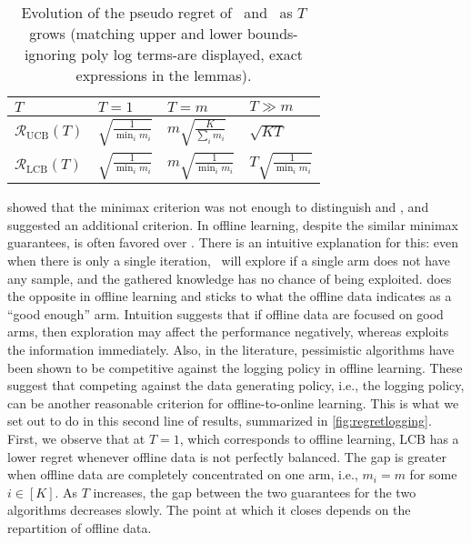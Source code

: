 \begin{table}[bth] 
\begin{center}
\renewcommand{\arraystretch}{1.4}
\begin{tabular}{>{\centering\arraybackslash}m{3cm} | |>{\centering\arraybackslash}m{3cm} |>{\centering\arraybackslash}m{3cm} |>{\centering\arraybackslash}m{3cm} }
\toprule
$T$ & $T = 1$ & $T = m$ & $T \gg m$ \\
 \hline\hline
 \addlinespace

$\mathcal{R}_{\text{UCB}}(T)$ & $\sqrt{\frac{1}{\min_i m_i}}$ & $m\sqrt{\frac{K}{\sum_i m_i}}$ & $\sqrt{KT}$ \\
\addlinespace
\hline
\addlinespace

$\mathcal{R}_{\text{LCB}}(T)$ & $\sqrt{\frac{1}{\min_i m_i}}$ & $m\sqrt{\frac{1}{\min_i m_i}}$ & $T\sqrt{\frac{1}{\min_i m_i}}$ \\
\bottomrule
\end{tabular}
\vspace{0.2cm}
\caption{Evolution of the pseudo regret of \alglcb\ and \algucb\ as $T$ grows (matching upper and lower bounds-ignoring poly log terms-are displayed, exact expressions in the lemmas).}
\label{fig:pseudoregret}
\end{center}
\end{table}





\cite{Xiao2021OnTO} showed that the minimax criterion was not enough to distinguish \algucb{} and \alglcb, and suggested an additional criterion. In offline learning, despite the similar minimax guarantees, \alglcb{} is often favored over \algucb. There is an intuitive explanation for this: even when there is only a single iteration, \algucb\ will explore if a single arm does not have any sample, and the gathered knowledge has no chance of being exploited. \alglcb{} does the opposite in offline learning and sticks to what the offline data indicates as a ``good enough'' arm. Intuition suggests that if offline data are focused on good arms, then exploration may affect the performance negatively, whereas \alglcb{} exploits the information immediately. Also, in the literature, pessimistic algorithms have been shown to be competitive against the logging policy in offline learning. These suggest that competing against the data generating policy, i.e., the logging policy, can be another reasonable criterion for offline-to-online learning. This is what we set out to do in this second line of results, summarized in \cref{fig:regretlogging}.
 First, we observe that at $T=1$, which corresponds to offline learning, LCB has a lower regret whenever offline data is not perfectly balanced. The gap is greater when offline data are completely concentrated on one arm, i.e., $m_i=m$ for some $i \in [K]$. As $T$ increases, the gap between the two guarantees for the two algorithms decreases slowly. The point at which it closes depends on the repartition of offline data.


